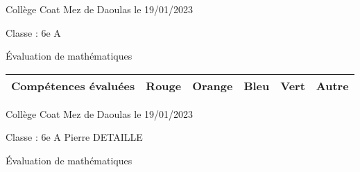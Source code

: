\documentclass[a4paper,12pt,fleqn]{article}
\begin{document}
\setcounter{exo}{0}


Collège Coat Mez de Daoulas  \hfill  le 19/01/2023

Classe : 6e A \hfill  

\begin{center}
\begin{LARGE} Évaluation de mathématiques \end{LARGE}
\end{center}





\begin{footnotesize}

\begin{center}

\begin{tabular}{|p{120mm}|p{8mm}|p{10mm}|p{8mm}|p{8mm}|p{8mm}|}

\hline
\textbf{Compétences évaluées} & \textbf{Rouge} & \textbf{Orange} & \textbf{Bleu} & \textbf{Vert} & \textbf{Autre} \\
\hline


\end{tabular}
\end{center}
\end{footnotesize}
\newpage
\setcounter{exo}{0}


Collège Coat Mez de Daoulas  \hfill  le 19/01/2023

Classe : 6e A \hfill Pierre DETAILLE

\begin{center}
\begin{LARGE} Évaluation de mathématiques \end{LARGE}
\end{center}

\end{document}
